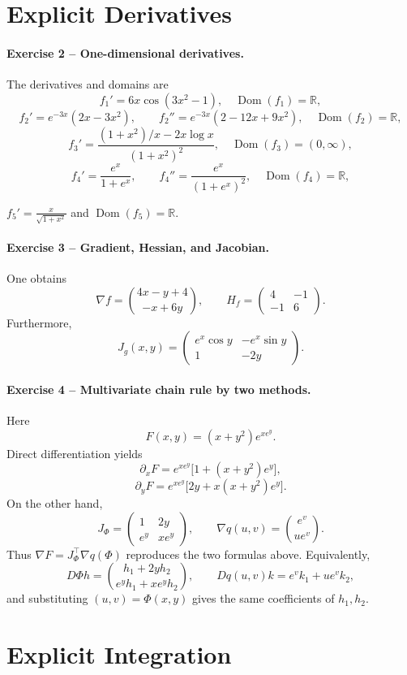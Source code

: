\documentclass[10pt]{article}
\newcommand{\R}{\mathbb{R}}
\newcommand{\solution}[1]{\begin{tcolorbox}[breakable,colback=ResultBlue!3,colframe=ResultBlue,
  boxrule=0.8pt,arc=1mm,title=\textbf{Result},fonttitle=\bfseries]#1\end{tcolorbox}}
\begin{document}
\section{Explicit Derivatives}

\paragraph{Exercise 2 -- One-dimensional derivatives.}
The derivatives and domains are
\[
f_1'=6x\cos(3x^2-1),\quad \operatorname{Dom}(f_1)=\R,
\]
\[
f_2'=e^{-3x}(2x-3x^2),\qquad
f_2''=e^{-3x}(2-12x+9x^2),\quad \operatorname{Dom}(f_2)=\R,
\]
\[
f_3'=\frac{(1+x^2)/x-2x\log x}{(1+x^2)^2},
\quad \operatorname{Dom}(f_3)=(0,\infty),
\]
\[
f_4'=\frac{e^x}{1+e^x},\qquad
f_4''=\frac{e^x}{(1+e^x)^2},\quad \operatorname{Dom}(f_4)=\R,
\]
\solution{$\displaystyle f_5'=\frac{x}{\sqrt{1+x^2}}$ and
$\operatorname{Dom}(f_5)=\R$.}

\paragraph{Exercise 3 -- Gradient, Hessian, and Jacobian.}
One obtains
\[
\nabla f=\binom{4x-y+4}{-x+6y},\qquad
H_f=\begin{pmatrix}4&-1\\-1&6\end{pmatrix}.
\]
Furthermore,
\[
J_g(x,y)=\begin{pmatrix}e^x\cos y&-e^x\sin y\\1&-2y\end{pmatrix}.
\]

\paragraph{Exercise 4 -- Multivariate chain rule by two methods.}
Here
\[
F(x,y)=(x+y^2)e^{xe^y}.
\]
Direct differentiation yields
\[
\partial_xF=e^{xe^y}\bigl[1+(x+y^2)e^y\bigr],
\]
\[
\partial_yF=e^{xe^y}\bigl[2y+x(x+y^2)e^y\bigr].
\]
On the other hand,
\[
J_\Phi=\begin{pmatrix}1&2y\\e^y&xe^y\end{pmatrix},\qquad
\nabla q(u,v)=\binom{e^v}{ue^v}.
\]
Thus $\nabla F=J_\Phi^\top\nabla q(\Phi)$ reproduces the two formulas above.
Equivalently,
\[
D\Phi h=\binom{h_1+2yh_2}{e^yh_1+xe^yh_2},\qquad
Dq(u,v)k=e^vk_1+ue^vk_2,
\]
and substituting $(u,v)=\Phi(x,y)$ gives the same coefficients of $h_1,h_2$.

\section{Explicit Integration}
\end{document}
